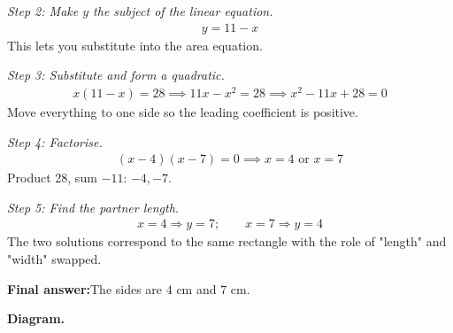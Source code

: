 \documentclass[11pt]{article}
\begin{document}
\textit{Step 2: Make \( y \) the subject of the linear equation.}
\[\begin{gathered}
y = 11 - x
\end{gathered}\]
This lets you substitute into the area equation.

\textit{Step 3: Substitute and form a quadratic.}
\[\begin{gathered}
x(11 - x) = 28 \implies 11x - x^2 = 28 \implies x^2 - 11x + 28 = 0
\end{gathered}\]
Move everything to one side so the leading coefficient is positive.

\textit{Step 4: Factorise.}
\[\begin{gathered}
(x - 4)(x - 7) = 0 \implies x = 4 \text{ or } x = 7
\end{gathered}\]
Product 28, sum \( -11 \): \( -4, -7 \).

\textit{Step 5: Find the partner length.}
\[\begin{gathered}
x = 4 \Rightarrow y = 7; \qquad x = 7 \Rightarrow y = 4
\end{gathered}\]
The two solutions correspond to the same rectangle with the role of "length" and "width" swapped.

\begin{answerbox}
\textbf{Final answer:}\quad The sides are \(\displaystyle 4\) cm and \(\displaystyle 7\) cm.
\end{answerbox}
\textbf{Diagram.}
\end{document}
